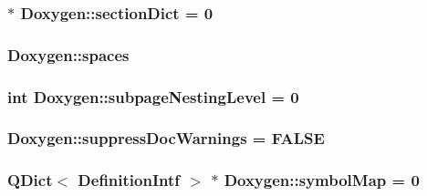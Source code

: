 \subsubsection[{section\+Dict}]{ $\ast$ Doxygen\+::section\+Dict = 0\hspace{0.3cm}{\ttfamily [static]}}\label{class_doxygen_a11ca62448704d211a405166d73337113}
\hypertarget{class_doxygen_a89b66309f30c63ea1a7b5d5d17bf12bf}{}
\subsubsection[{spaces}]{ Doxygen\+::spaces\hspace{0.3cm}{\ttfamily [static]}}\label{class_doxygen_a89b66309f30c63ea1a7b5d5d17bf12bf}
\hypertarget{class_doxygen_a6a2eb84be879cca04e934c86d7b0cd94}{}
\subsubsection[{subpage\+Nesting\+Level}]{\setlength{\rightskip}{0pt plus 5cm}int Doxygen\+::subpage\+Nesting\+Level = 0\hspace{0.3cm}{\ttfamily [static]}}\label{class_doxygen_a6a2eb84be879cca04e934c86d7b0cd94}
\hypertarget{class_doxygen_a0f0f967e0b97a2292ba58f22b8a1e817}{}
\subsubsection[{suppress\+Doc\+Warnings}]{ Doxygen\+::suppress\+Doc\+Warnings = {\bf F\+A\+L\+S\+E}\hspace{0.3cm}{\ttfamily [static]}}\label{class_doxygen_a0f0f967e0b97a2292ba58f22b8a1e817}
\hypertarget{class_doxygen_a089679b41a1b70f299d653312097f879}{}
\subsubsection[{symbol\+Map}]{\setlength{\rightskip}{0pt plus 5cm}Q\+Dict$<$ {\bf Definition\+Intf} $>$ $\ast$ Doxygen\+::symbol\+Map = 0\hspace{0.3cm}{\ttfamily [static]}}\label{class_doxygen_a089679b41a1b70f299d653312097f879}
\hypertarget{class_doxygen_ad63a00fa6d4a5378ab8cd988e0b6df16}{}
